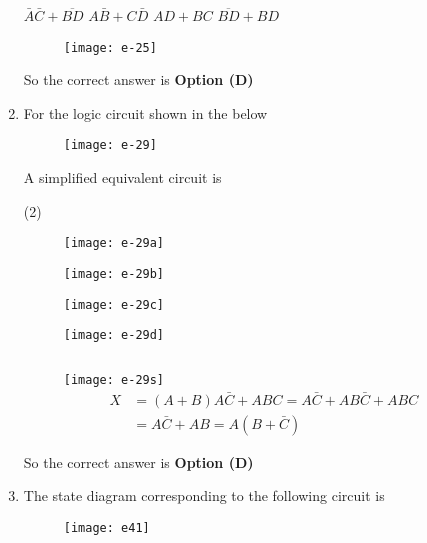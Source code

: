 \begin{enumerate}
\begin{tasks}
\task[\textbf{A.}] $\bar{A} \bar{C}+\overline{B D}$
\task[\textbf{B.}] $A \bar{B}+C \bar{D}$
\task[\textbf{C.}]  $A D+B C$
\task[\textbf{D.}] $\overline{B D}+B D$
\end{tasks}
\begin{answer}
\begin{figure}[H]
	\centering
	\texttt{[image: e-25]}
\end{figure}
So the correct answer is \textbf{Option (D)}
\end{answer}
	\item For the logic circuit shown in the below\\
	\begin{figure}[H]
		\centering
		\texttt{[image: e-29]}
	\end{figure}
	A simplified equivalent circuit is
{	}
\begin{tasks}(2)
\task[\textbf{A.}] 
\begin{figure}[H]
	\centering
	\texttt{[image: e-29a]}
\end{figure}
\task[\textbf{B.}] \begin{figure}[H]
	\centering
	\texttt{[image: e-29b]}
\end{figure}
\task[\textbf{C.}] \begin{figure}[H]
	\centering
	\texttt{[image: e-29c]}
\end{figure}
\task[\textbf{D.}] \begin{figure}[H]
	\centering
	\texttt{[image: e-29d]}
\end{figure}
\end{tasks}
\begin{answer}$\left. \right. $
\begin{figure}[H]
	\centering
	\texttt{[image: e-29s]}
	\begin{align*}
	X&=(A+B) A \bar{C}+A B C=A \bar{C}+A B \bar{C}+A B C\\&=A \bar{C}+A B=A(B+\bar{C})
	\end{align*}
\end{figure}
So the correct answer is \textbf{Option (D)}
\end{answer}
	\item The state diagram corresponding to the following circuit is
{	}
\begin{figure}[H]
\centering
\texttt{[image: e41]}

\end{figure}
\end{enumerate}
